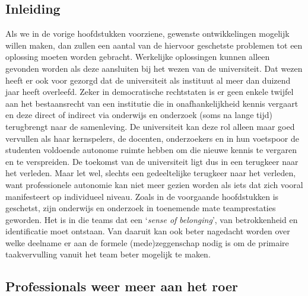 \documentclass[smallauthor, chapterhaspagenum, nochapterinheader, pagenuminheader,  bigchapnum,medium2, tocpages, garamond, titleinheader]{jote-book}
\begin{document}
	\subsection{Inleiding}



	Als we in de vorige hoofdstukken voorziene, gewenste ontwikkelingen mogelijk willen maken, dan zullen een aantal van de hiervoor geschetste problemen tot een oplossing moeten worden gebracht. Werkelijke oplossingen kunnen alleen gevonden worden als deze aansluiten bij het wezen van de universiteit. Dat wezen heeft er ook voor gezorgd dat de universiteit als instituut al meer dan duizend jaar heeft overleefd. Zeker in democratische rechtstaten is er geen enkele twijfel aan het bestaansrecht van een institutie die in onafhankelijkheid kennis vergaart en deze direct of indirect via onderwijs en onderzoek (soms na lange tijd) terugbrengt naar de samenleving. De universiteit kan deze rol alleen maar goed vervullen als haar kernspelers, de docenten, onderzoekers en in hun voetspoor de studenten voldoende autonome ruimte hebben om die nieuwe kennis te vergaren en te verspreiden. De toekomst van de universiteit ligt dus in een terugkeer naar het verleden. Maar let wel, slechts een gedeeltelijke terugkeer naar het verleden, want professionele autonomie kan niet meer gezien worden als iets dat zich vooral manifesteert op individueel niveau. Zoals in de voorgaande hoofdstukken is geschetst, zijn onderwijs en onderzoek in toenemende mate teamprestaties geworden. Het is in die teams dat een ‘\emph{sense of }\emph{belonging}', van betrokkenheid en identificatie moet ontstaan. Van daaruit kan ook beter nagedacht worden over welke deelname er aan de formele (mede)zeggenschap nodig is om de primaire taakvervulling vanuit het team beter mogelijk te maken.



	\subsection{Professionals weer meer aan het roer}
\end{document}
